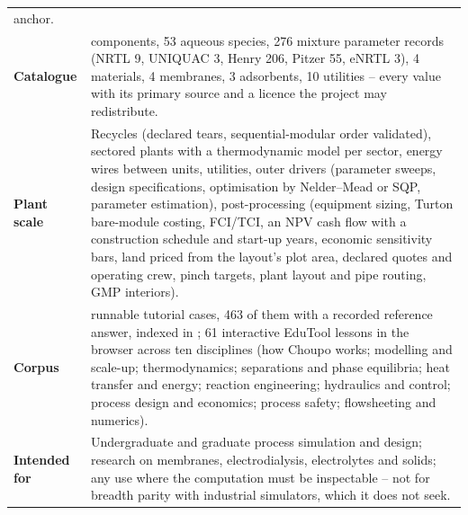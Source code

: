 \documentclass[11pt,a4paper]{article}
\newcommand{\code}[1]{\texttt{\detokenize{#1}}}
\begin{document}
\begin{table}[!t]
\begin{tabularx}{\linewidth}{>{\raggedright\arraybackslash}p{3.1cm}
                             >{\raggedright\arraybackslash}X}
  anchor. \\
\textbf{Catalogue} & 604 components, 53 aqueous species, 276 mixture
  parameter records (NRTL 9, UNIQUAC 3, Henry 206, Pitzer 55, eNRTL 3),
  4 materials, 4 membranes, 3 adsorbents, 10 utilities -- every value
  with its primary source and a licence the project may redistribute. \\
\textbf{Plant scale} & Recycles (declared tears, sequential-modular order
  validated), sectored plants with a thermodynamic model per sector,
  energy wires between units, utilities, outer drivers (parameter sweeps,
  design specifications, optimisation by Nelder--Mead or SQP, parameter
  estimation), post-processing (equipment sizing, Turton bare-module costing, FCI/TCI,
  an NPV cash flow with a construction schedule and start-up years,
  economic sensitivity bars, land priced from the layout's plot area,
  declared quotes and operating crew, pinch targets, plant layout and
  pipe routing, GMP interiors). \\
\textbf{Corpus} & 480 runnable tutorial cases, 463 of them with a
  recorded reference answer, indexed in \code{docs/tutorials-catalogue.md};
  61 interactive EduTool lessons in the browser across ten disciplines (how
  Choupo works; modelling and scale-up; thermodynamics; separations and
  phase equilibria; heat transfer and energy; reaction engineering;
  hydraulics and control; process design and economics; process safety;
  flowsheeting and numerics). \\
\textbf{Intended for} & Undergraduate and graduate process simulation and
  design; research on membranes, electrodialysis, electrolytes and solids;
  any use where the computation must be inspectable -- not for breadth
  parity with industrial simulators, which it does not seek. \\
\bottomrule
\end{tabularx}
\end{table}
\end{document}
